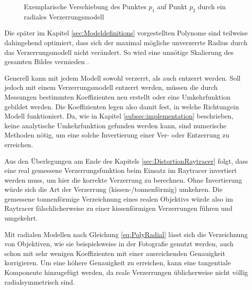 \begin{figure}[h]
	\centering
	
	\caption{Exemplarische Verschiebung des Punktes $p_1$ auf Punkt $p_2$ durch ein radiales Verzerrungsmodell}
	\label{fig:DistExample}
\end{figure}

Die später im Kapitel \ref{sec:Modeldefinitions} vorgestellten Polynome sind teilweise dahingehend optimiert, dass sich der maximal mögliche unverzerrte Radius durch das Verzerrungsmodell nicht verändert. So wird eine unnötige Skalierung des gesamten Bildes vermieden \cite{ScalePreservingLensDistortion}.

Generell kann mit jedem Modell sowohl verzerrt, als auch entzerrt werden. Soll jedoch mit einem Verzerrungsmodell entzerrt werden, müssen die durch Messungen bestimmten Koeffizienten neu erstellt oder eine Umkehrfunktion gebildet werden. Die Koeffizienten legen also damit fest, in welche \glqq Richtung\grqq{ }ein Modell funktioniert. Da, wie in Kapitel \ref{subsec:implementation} beschrieben, keine analytische Umkehrfunktion gefunden werden kann, sind numerische Methoden nötig, um eine solche Invertierung einer Ver- oder Entzerrung zu erreichen. 

Aus den Überlegungen am Ende des Kapitels \ref{sec:DistortionRaytracer} folgt, dass eine real gemessene Verzerrungsfunktion beim Einsatz im Raytracer invertiert werden muss, um hier die korrekte Verzerrung zu berechnen. Ohne Invertierung würde sich die Art der Verzerrung (kissen-/tonnenförmig) umkehren. Die gemessene tonnenförmige Verzeichnung eines realen Objektivs würde also im Raytracer fälschlicherweise zu einer kissenförmigen Verzerrungen führen und umgekehrt.

Mit radialen Modellen nach Gleichung \ref{eq:PolyRadial} lässt sich die Verzeichnung von Objektiven, wie sie beispielsweise in der Fotografie genutzt werden, auch schon mit sehr wenigen Koeffizienten mit einer ausreichenden Genauigkeit korrigieren. Um eine höhere Genauigkeit zu erreichen, kann eine tangentiale Komponente hinzugefügt werden, da reale Verzerrungen üblicherweise nicht völlig radialsymmetrisch sind.